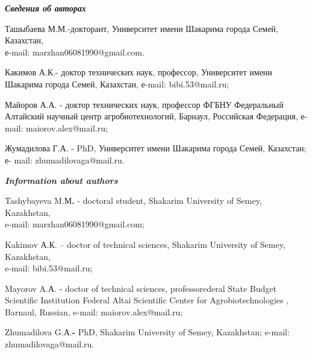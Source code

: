 \emph{{\bfseries Сведения об авторах}}

\begin{noparindent}

Ташыбаева М.М.-докторант, Университет имени Шакарима города Семей,
Казахстан, \\е-mail: marzhan06081990@gmail.com.

Какимов А.К.- доктор технических наук, профессор, Университет имени
Шакарима города Семей, Казахстан, е-mail: bibi.53@mail.ru;

Майоров А.А. - доктор технических наук, профессор ФГБНУ Федеральный
Алтайский научный центр агробиотехнологий, Барнаул, Российская
Федерация, е-mail: maiorov.alex@mail.ru;

Жумадилова Г.А. - PhD, Университет имени Шакарима города Семей,
Казахстан; \\е- mail: zhumadilovaga@mail.ru.

\end{noparindent}

\emph{{\bfseries Information about authors}}

\begin{noparindent}

Tashybayeva M.М{\bfseries .} - doctoral student, Shakarim University of
Semey, Kazakhstan, \\e-mail: marzhan06081990@gmail.com;

Kakimov А.К. -- doctor of technical sciences, Shakarim University of
Semey, Kazakhstan, \\e-mail: bibi.53@mail.ru;

Mayorov A.А. - doctor of technical sciences, professorederal State
Budget Scientific Institution Federal Altai Scientific Center for
Agrobiotechnologies , Barnaul, Russian, e-mail: maiorov.alex@mail.ru;

Zhumadilova G.А.{\bfseries -} PhD, Shakarim University of Semey,
Kazakhstan; e-mail: zhumadilovaga@mail.ru.


\end{noparindent}

